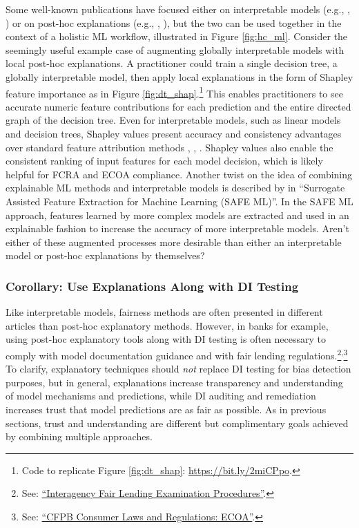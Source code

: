 \documentclass{article}
\begin{document}
Some well-known publications have focused either on interpretable models (e.g., \citet{slim}, \citet{sbrl}) or on post-hoc explanations (e.g., \citet{shapley}, \citet{lime}), but the two can be used together in the context of a holistic ML workflow, illustrated in Figure \ref{fig:hc_ml}. Consider the seemingly useful example case of augmenting globally interpretable models with local post-hoc explanations. A practitioner could train a single decision tree, a globally interpretable model, then apply local explanations in the form of Shapley feature importance as in Figure \ref{fig:dt_shap}.\footnote{\scriptsize{Code to replicate Figure \ref{fig:dt_shap}: \url{https://bit.ly/2miCPpo}.}} This enables practitioners to see accurate numeric feature contributions for each prediction and the entire directed graph of the decision tree. Even for interpretable models, such as linear models and decision trees, Shapley values present accuracy and consistency advantages over standard feature attribution methods \cite{lipovetsky2001analysis}, \cite{shapley}, \cite{tree_shap}. Shapley values also enable the consistent ranking of input features for each model decision, which is likely helpful for FCRA and ECOA compliance. Another twist on the idea of combining explainable ML methods and interpretable models is described by \citet{gosiewska2019safe} in ``Surrogate Assisted Feature Extraction for Machine Learning (SAFE ML)''. In the SAFE ML approach, features learned by more complex models are extracted and used in an explainable fashion to increase the accuracy of more interpretable models. Aren't either of these augmented processes more desirable than either an interpretable model or post-hoc explanations by themselves?

\subsubsection{Corollary: Use Explanations Along with DI Testing} \label{cor:ex_di}

Like interpretable models, fairness methods are often presented in different articles than post-hoc explanatory methods. However, in banks for example, using post-hoc explanatory tools along with DI testing is often necessary to comply with model documentation guidance and with fair lending regulations.\footnote{\scriptsize{See: \href{https://www.ffiec.gov/pdf/fairlend.pdf}{``Interagency Fair Lending Examination Procedures''}.}}\textsuperscript{,}\footnote{\scriptsize{See: \href{https://files.consumerfinance.gov/f/documents/201510_cfpb_ecoa-narrative-and-procedures.pdf}{``CFPB Consumer Laws and Regulations: ECOA''}.}} To clarify, explanatory techniques should \textit{not} replace DI testing for bias detection purposes, but in general, explanations increase transparency and understanding of model mechanisms and predictions, while DI auditing and remediation increases trust that model predictions are as fair as possible. As in previous sections, trust and understanding are different but complimentary goals achieved by combining multiple approaches.
\end{document}
